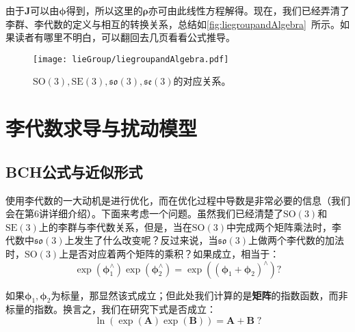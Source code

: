 由于$\bm{J}$可以由$\boldsymbol{\phi}$得到，所以这里的$\boldsymbol{\rho}$亦可由此线性方程解得。现在，我们已经弄清了李群、李代数的定义与相互的转换关系，总结如\autoref{fig:liegroupandAlgebra}~所示。如果读者有哪里不明白，可以翻回去几页看看公式推导。

\begin{figure}[!ht]
	\centering
	\texttt{[image: lieGroup/liegroupandAlgebra.pdf]}
	\caption{$\mathrm{SO}(3),\mathrm{SE}(3),\mathfrak{so}(3), \mathfrak{se}(3)$的对应关系。}
	\label{fig:liegroupandAlgebra}
\end{figure}

\clearpage

\section{李代数求导与扰动模型}
\subsection{BCH公式与近似形式}
使用李代数的一大动机是进行优化，而在优化过程中导数是非常必要的信息（我们会在第6讲详细介绍）。下面来考虑一个问题。虽然我们已经清楚了$\mathrm{SO}(3)$和$\mathrm{SE}(3)$上的李群与李代数关系，但是，当在$\mathrm{SO}(3)$中完成两个矩阵乘法时，李代数中$\mathfrak{so}(3)$上发生了什么改变呢？反过来说，当$\mathfrak{so}(3)$上做两个李代数的加法时，$\mathrm{SO}(3)$上是否对应着两个矩阵的乘积？如果成立，相当于：
\[
\exp \left( {\boldsymbol{\phi} _1^ \wedge } \right)\exp \left( {\boldsymbol{\phi} _2^ \wedge } \right) = \exp \left( {{{\left( {{\boldsymbol{\phi} _1} + {\boldsymbol{\phi} _2}} \right)}^ \wedge }} \right) ?
\]

如果$\boldsymbol{\phi}_1, \boldsymbol{\phi}_2$为标量，那显然该式成立；但此处我们计算的是\textbf{矩阵}的指数函数，而非标量的指数。换言之，我们在研究下式是否成立：
\[
	\ln \left( \exp \left( \bm{A} \right) \exp \left( \bm{B} \right) \right) = \bm{A} + \bm{B} \; ?
\]

